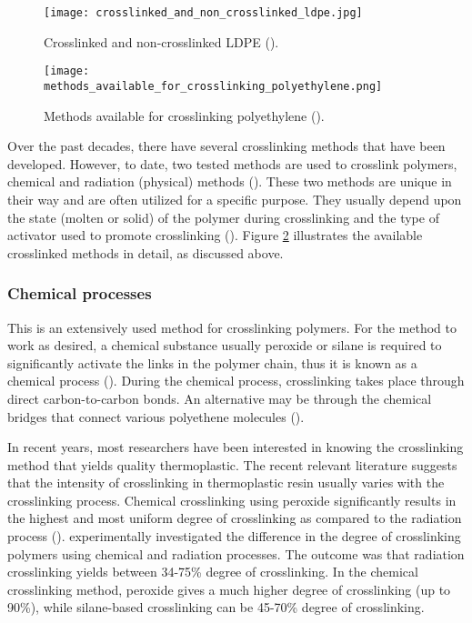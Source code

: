 \begin{figure}[H]
    \centering
    \texttt{[image: crosslinked\_and\_non\_crosslinked\_ldpe.jpg]}
    \caption{Crosslinked and non-crosslinked LDPE (\cite{kurtz2009cross}).}
    \label{ch3:figure:ldpe}
\end{figure}

\begin{figure}[H]
    \centering
    \texttt{[image: methods\_available\_for\_crosslinking\_polyethylene.png]}
    \caption{Methods available for crosslinking polyethylene (\cite{patterson2022cross}).}
    \label{ch3:figure:crosslinking_methods}
\end{figure}

Over the past decades, there have several crosslinking methods that have been developed. However, to date, two tested methods are used to crosslink polymers, chemical and radiation (physical) methods (\cite{clemens2017microstructure, bajaj2020steels}). These two methods are unique in their way and are often utilized for a specific purpose. They usually depend upon the state (molten or solid) of the polymer during crosslinking and the type of activator used to promote crosslinking (\cite{kurtz2009cross}). Figure \ref{ch3:figure:crosslinking_methods} illustrates the available crosslinked methods in detail, as discussed above.

\subsubsection{Chemical processes}
This is an extensively used method for crosslinking polymers. For the method to work as desired, a chemical substance usually peroxide or silane is required to significantly activate the links in the polymer chain, thus it is known as a chemical process (\cite{peacock2000handbook}). During the chemical process, crosslinking takes place through direct carbon-to-carbon bonds. An alternative may be through the chemical bridges that connect various polyethene molecules (\cite{kurtz2009cross}). 

In recent years, most researchers have been interested in knowing the crosslinking method that yields quality thermoplastic. The recent relevant literature suggests that the intensity of crosslinking in thermoplastic resin usually varies with the crosslinking process. Chemical crosslinking using peroxide significantly results in the highest and most uniform degree of crosslinking as compared to the radiation process (\cite{clemens2017microstructure, bajaj2020steels}). \cite{peacock2000handbook} experimentally investigated the difference in the degree of crosslinking polymers using chemical and radiation processes. The outcome was that radiation crosslinking yields between 34-75\% degree of crosslinking. In the chemical crosslinking method, peroxide gives a much higher degree of crosslinking (up to 90\%), while silane-based crosslinking can be 45-70\% degree of crosslinking.

